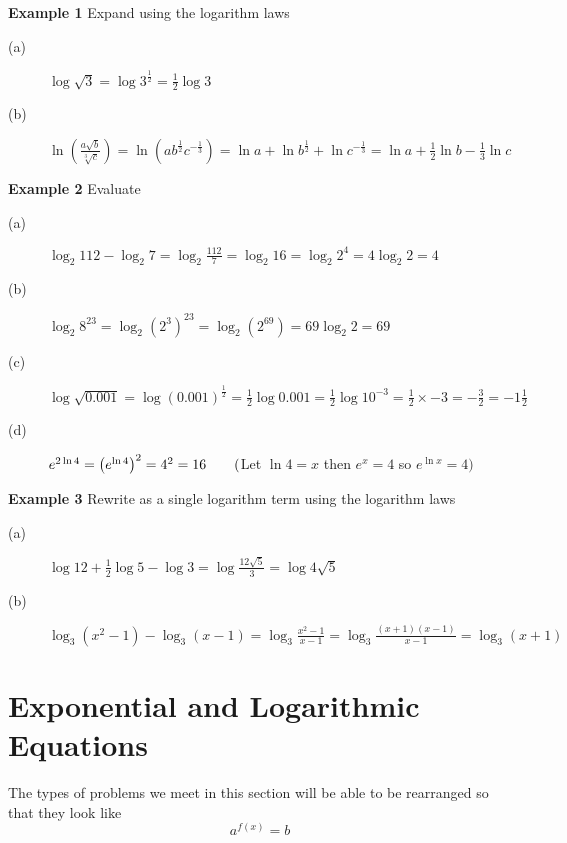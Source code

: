 \textbf{Example 1}
Expand using the logarithm laws 
\begin{description}
	\item [(a)] $\log  \sqrt{3} =\log  3^{\frac{1}{2}} =\frac{1}{2} \log  3$ 
	
	\item [(b)] $\ln  \genfrac{(}{)}{}{}{a \sqrt{b}}{\sqrt[{3}]{c}} =\ln  \left (a b^{\frac{1}{2}} c^{ -\frac{1}{3}}\right ) =\ln  a +\ln  b^{\frac{1}{2}} +\ln  c^{ -\frac{1}{3}} =\ln  a +\frac{1}{2} \ln  b -\frac{1}{3} \ln  c$ \end{description}

\textbf{Example 2}
Evaluate
\begin{description}
	\item [(a)] $\log _{2} 112 -\log _{2} 7 =\log _{2} \frac{112}{7} =\log _{2} 16 =\log _{2} 2^{4} =4 \log _{2} 2 =4$ 
	
	\item [(b)] $\log _{2} 8^{23} =\log _{2} \left (2^{3}\right )^{23} =\log _{2} \left (2^{69}\right ) =69 \log _{2} 2 =69$ 
	
	\item [(c)] $\log  \sqrt{0.001} =\log  \left (0.001\right )^{\frac{1}{2}} =\frac{1}{2} \log  0.001 =\frac{1}{2} \log  10^{ -3} =\frac{1}{2} \times  -3 = -\frac{3}{2} = -1\frac{1}{2}$ 
	
	\item [(d)] $e^{2 \ln  4} =\left (e^{\ln  4}\right )^{2} =4^{2} =16\text{\quad \quad }($Let $\ln  4 =x$ then $e^{x} =4$ so $e^{\ln  x} =4)$ \end{description}

\textbf{Example 3}
Rewrite as a single logarithm term using the logarithm laws 
\begin{description}
	\item [(a)] $\log  12 +\frac{1}{2} \log  5 -\log  3 =\log  \frac{12 \sqrt{5}}{3} =\log  4 \sqrt{5}$ 
	
	\item [(b)] $\log _{3} \left (x^{2} -1\right ) -\log _{3} \left (x -1\right ) =\log _{3} \frac{x^{2} -1}{x -1} =\log _{3} \frac{\left (x +1\right ) \left (x -1\right )}{x -1} =\log _{3} \left (x +1\right )$ \end{description}



\section{Exponential and Logarithmic Equations}
The types of problems we meet in this section will be able to be rearranged so that they look like
\begin{equation*}a^{f (x)} =b
\end{equation*}

